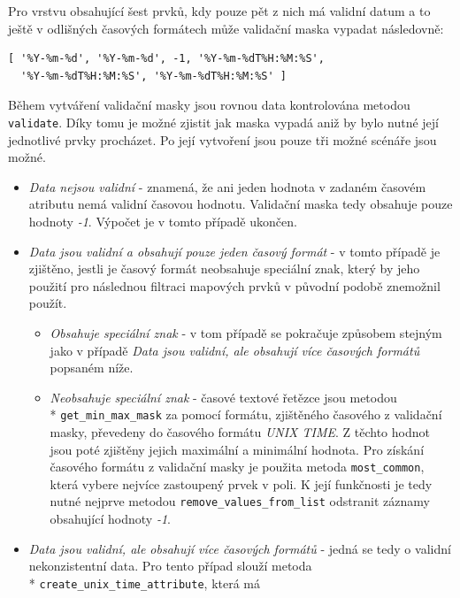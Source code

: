 Pro vrstvu obsahující šest prvků, kdy pouze pět z nich má validní
datum a to ještě v odlišných časových formátech může validační maska
vypadat následovně:

\begin{verbatim}
[ '%Y-%m-%d', '%Y-%m-%d', -1, '%Y-%m-%dT%H:%M:%S',
  '%Y-%m-%dT%H:%M:%S', '%Y-%m-%dT%H:%M:%S' ]
\end{verbatim}

Během vytváření validační masky jsou rovnou data kontrolována
metodou \verb|validate|. Díky tomu je možné zjistit jak maska vypadá
aniž by bylo nutné její jednotlivé prvky procházet. Po její vytvoření
jsou pouze tři možné scénáře jsou možné.


\begin{itemize}
	\item\textit{Data nejsou validní} - znamená, že ani jeden
	hodnota v zadaném časovém atributu nemá validní časovou
	hodnotu. Validační maska tedy obsahuje pouze
	hodnoty \textit{-1}. Výpočet je v tomto případě
	ukončen.  \item\textit{Data jsou validní a obsahují pouze
	jeden časový formát} - v tomto případě je zjištěno, jestli je
	časový formát neobsahuje speciální znak, který by jeho použití
	pro následnou filtraci mapových prvků v původní podobě
	znemožnil použít.  \begin{itemize} \item\textit{Obsahuje
	speciální znak} - v tom případě se pokračuje způsobem stejným
	jako v případě \textit{Data jsou validní, ale obsahují více
	časových formátů} popsaném níže.  \item\textit{Neobsahuje
	speciální znak} - časové textové řetězce jsou
	metodou \\* \verb|get_min_max_mask| za pomocí formátu,
	zjištěného časového z validační masky, převedeny do časového
	formátu \textit{UNIX TIME}. Z těchto hodnot jsou poté zjištěny
	jejich maximální a minimální hodnota.  Pro získání časového
	formátu z validační masky je použita
	metoda \verb|most_common|, která vybere nejvíce zastoupený
	prvek v poli. K její funkčnosti je tedy nutné nejprve
	metodou \verb|remove_values_from_list| odstranit záznamy
	obsahující
	hodnoty \textit{-1}.  \end{itemize} \item\textit{Data jsou
	validní, ale obsahují více časových formátů} - jedná se tedy o
	validní nekonzistentní data. Pro tento případ slouží
	metoda \\* \verb|create_unix_time_attribute|, která má

\end{itemize}
